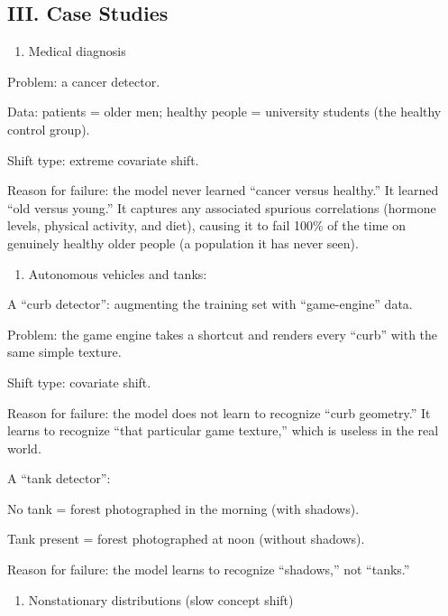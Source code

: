 \hypertarget{iii.-case-studies}{%
\subsection{III. Case Studies}\label{iii.-case-studies}}

\begin{enumerate}
\def\labelenumi{\arabic{enumi}.}
\tightlist
\item
  Medical diagnosis
\end{enumerate}

Problem: a cancer detector.

Data: patients = older men; healthy people = university students (the healthy control group).

Shift type: extreme covariate shift.

Reason for failure: the model never learned ``cancer versus healthy.'' It learned ``old versus young.'' It captures any associated spurious correlations (hormone levels, physical activity, and diet), causing it to fail 100\% of the time on genuinely healthy older people (a population it has never seen).

\begin{enumerate}
\def\labelenumi{\arabic{enumi}.}
\setcounter{enumi}{1}
\tightlist
\item
{}
  Autonomous vehicles and tanks:
\end{enumerate}

A ``curb detector'': augmenting the training set with ``game-engine'' data.

Problem: the game engine takes a shortcut and renders every ``curb'' with the same simple texture.

Shift type: covariate shift.

Reason for failure: the model does not learn to recognize ``curb geometry.'' It learns to recognize ``that particular game texture,'' which is useless in the real world.

A ``tank detector'':

No tank = forest photographed in the morning (with shadows).

Tank present = forest photographed at noon (without shadows).

Reason for failure: the model learns to recognize ``shadows,'' not ``tanks.''

\begin{enumerate}
\def\labelenumi{\arabic{enumi}.}
\setcounter{enumi}{2}
\tightlist
\item
  Nonstationary distributions (slow concept shift)
\end{enumerate}

